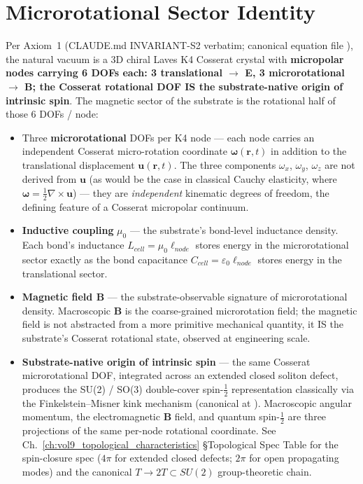 \section{Microrotational Sector Identity}
\label{sec:vol9_microrotational_sector_identity}

Per Axiom~1 (CLAUDE.md INVARIANT-S2 verbatim; canonical equation file ), the natural vacuum is a 3D chiral Laves K4 Cosserat crystal with \textbf{micropolar nodes carrying 6 DOFs each: 3 translational $\to$ E, 3 microrotational $\to$ B; the Cosserat rotational DOF IS the substrate-native origin of intrinsic spin}. The magnetic sector of the substrate is the rotational half of those 6 DOFs / node:

\begin{itemize}
    \item Three \textbf{microrotational} DOFs per K4 node --- each node carries an independent Cosserat micro-rotation coordinate $\boldsymbol{\omega}(\mathbf{r}, t)$ in addition to the translational displacement $\mathbf{u}(\mathbf{r}, t)$. The three components $\omega_x$, $\omega_y$, $\omega_z$ are not derived from $\mathbf{u}$ (as would be the case in classical Cauchy elasticity, where $\boldsymbol{\omega} = \tfrac{1}{2}\nabla \times \mathbf{u}$) --- they are \emph{independent} kinematic degrees of freedom, the defining feature of a Cosserat micropolar continuum.
    \item \textbf{Inductive coupling} $\mu_0$ --- the substrate's bond-level inductance density. Each bond's inductance $L_{cell} = \mu_0 \ell_{node}$ stores energy in the microrotational sector exactly as the bond capacitance $C_{cell} = \varepsilon_0 \ell_{node}$ stores energy in the translational sector.
    \item \textbf{Magnetic field $\mathbf{B}$} --- the substrate-observable signature of microrotational density. Macroscopic $\mathbf{B}$ is the coarse-grained microrotation field; the magnetic field is not abstracted from a more primitive mechanical quantity, it IS the substrate's Cosserat rotational state, observed at engineering scale.
    \item \textbf{Substrate-native origin of intrinsic spin} --- the same Cosserat microrotational DOF, integrated across an extended closed soliton defect, produces the SU(2) / SO(3) double-cover spin-$\tfrac{1}{2}$ representation classically via the Finkelstein--Misner kink mechanism (canonical at ). Macroscopic angular momentum, the electromagnetic $\mathbf{B}$ field, and quantum spin-$\tfrac{1}{2}$ are three projections of the same per-node rotational coordinate. See Ch.~\ref{ch:vol9_topological_characteristics} \S Topological Spec Table for the spin-closure spec ($4\pi$ for extended closed defects; $2\pi$ for open propagating modes) and the canonical $T \to 2T \subset SU(2)$ group-theoretic chain.
\end{itemize}

